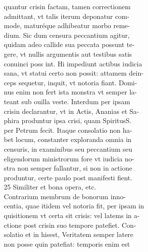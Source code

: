 \documentclass{article}
\begin{document}
\begin{pages}
                quantur crisin factam, tamen correctionem \\
                admittant, vt talis iterum deponatur com- \\
                mode, maturéque adhibeatur morbo reme- \\
                dium. Sic dum censura peccantium agitur, \\
                quidam adeo callide sua peccata possunt te- \\
                gere, vt nullis argumentis aut testibus satis \\
                conuinci poss int. Hi impediunt actibus iudicia \\
                sana, vt statui certo non possit: attamem dein- \\
                ceps sequetur, inquit, vt notoria fiant. Domi- \\
                nus enim non fert ista monstra vt semper la- \\
                teant sub ouilla veste. Interdum per ipsam \\
                crisin declarantur, vt in Actis, Ananias et Sa- \\
                phira produntur ipsa crisi, quam SpiritusS. \\
                per Petrum fecit. Itaque consolatio non ha- \\
                bet locum, constanter exploranda omnia in \\
                censuris, in examinibus seu peccantium seu \\
                eligendorum ministrorum fore vt iudicia no- \\
                stra non semper fallantur, si non in actione \\
                produntur, certe paulo post manifesti fient. \\
                25 Similiter et bona opera, etc. \\
                Contrarium membrum de bonorum inno- \\
                centia, quae itidem vel notoria fit, per ipsam in \\
                quisitionem vt certa sit crisis: vel latems in a- \\
                ctione post crisin suo tempore patefiet. Con- \\
                solatio et in hisest, Veritatem semper latere \\
                non posse quin patefiat: temporis enim est \\

\end{pages}
\end{document}

